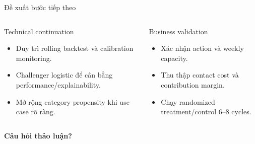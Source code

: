 \documentclass[aspectratio=169,11pt]{beamer}
\begin{document}
\begin{frame}{Đề xuất bước tiếp theo}
  \begin{columns}[T,onlytextwidth]
      \begin{block}{Technical continuation}
        \begin{itemize}
          \item Duy trì rolling backtest và calibration monitoring.
          \item Challenger logistic để cân bằng performance/explainability.
          \item Mở rộng category propensity khi use case rõ ràng.
        \end{itemize}
      \end{block}
      \begin{block}{Business validation}
        \begin{itemize}
          \item Xác nhận action và weekly capacity.
          \item Thu thập contact cost và contribution margin.
          \item Chạy randomized treatment/control 6--8 cycles.
        \end{itemize}
      \end{block}
  \end{columns}
  \vspace{0.55cm}
  \centering
  \Large\color{Navy}\bfseries Câu hỏi thảo luận?
\end{frame}

\appendix
\end{document}
